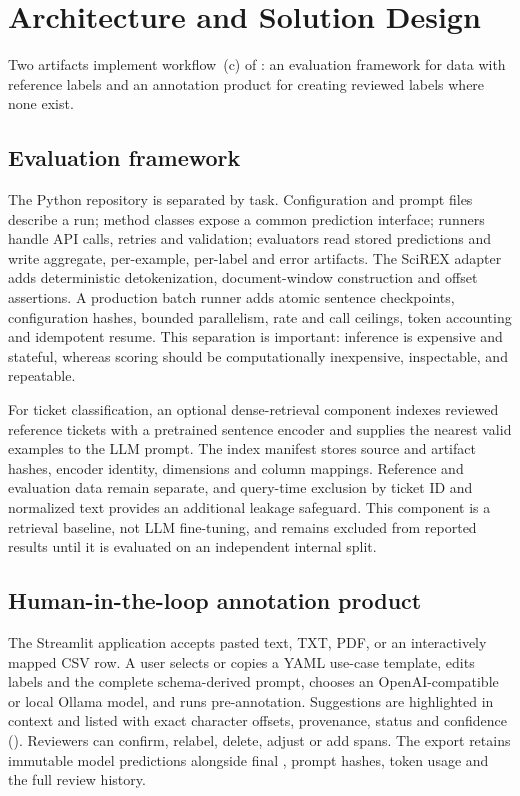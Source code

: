 \section{Architecture and Solution Design}
\label{sec:architecture}

Two artifacts implement workflow~(c) of : an evaluation
framework for data with reference labels and an annotation product for creating
reviewed labels where none exist.

\subsection{Evaluation framework}

The Python repository is separated by task. Configuration and prompt files
describe a run; method classes expose a common prediction interface; runners
handle API calls, retries and validation; evaluators read stored predictions and
write aggregate, per-example, per-label and error artifacts. The SciREX adapter
adds deterministic detokenization, document-window construction and offset
assertions. A production batch runner adds atomic sentence checkpoints,
configuration hashes, bounded parallelism, rate and call ceilings, token
accounting and idempotent resume. This separation is important: inference is
expensive and stateful, whereas scoring should be computationally inexpensive,
inspectable, and repeatable.

For ticket classification, an optional dense-retrieval component indexes
reviewed reference tickets with a pretrained sentence encoder and supplies the
nearest valid examples to the LLM prompt. The index manifest stores source and
artifact hashes, encoder identity, dimensions and column mappings. Reference
and evaluation data remain separate, and query-time exclusion by ticket ID and
normalized text provides an additional leakage safeguard. This component is a
retrieval baseline, not LLM fine-tuning, and remains excluded from reported
results until it is evaluated on an independent internal split.

\subsection{Human-in-the-loop annotation product}

The Streamlit application accepts pasted text, TXT, PDF, or an interactively
mapped CSV row. A user selects or copies a YAML use-case template, edits labels
and the complete schema-derived prompt, chooses an OpenAI-compatible or local
Ollama model, and runs pre-annotation. Suggestions are highlighted in context
and listed with exact character offsets, provenance, status and confidence
(). Reviewers can confirm, relabel, delete, adjust or add spans.
The export retains immutable model predictions alongside final
, prompt hashes, token usage and the full review history.

